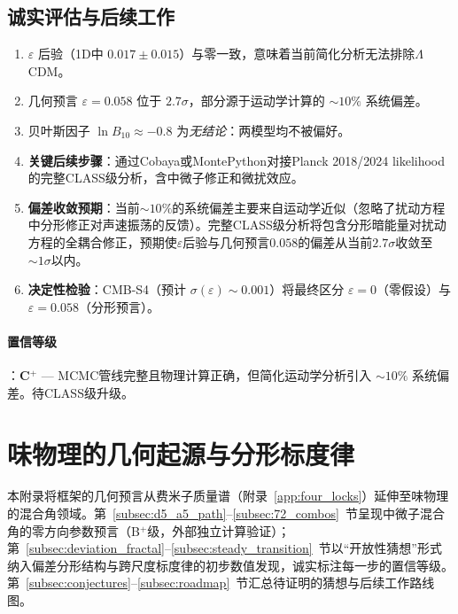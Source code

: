\documentclass[12pt,a4paper,twocolumn]{article}
\begin{document}
\subsection{诚实评估与后续工作}
\begin{enumerate}
\item $\varepsilon$ 后验（1D中 $0.017 \pm 0.015$）与零一致，意味着当前简化分析无法排除$\Lambda$CDM。
\item 几何预言 $\varepsilon = 0.058$ 位于 $2.7\sigma$，部分源于运动学计算的 $\sim 10\%$ 系统偏差。
\item 贝叶斯因子 $\ln B_{10} \approx -0.8$ 为\emph{无结论}：两模型均不被偏好。
\item \textbf{关键后续步骤}：通过Cobaya或MontePython对接Planck 2018/2024 likelihood的完整CLASS级分析，含中微子修正和微扰效应。
\item \textbf{偏差收敛预期}：当前$\sim10\%$的系统偏差主要来自运动学近似（忽略了扰动方程中分形修正对声速振荡的反馈）。完整CLASS级分析将包含分形暗能量对扰动方程的全耦合修正，预期使$\varepsilon$后验与几何预言$0.058$的偏差从当前$2.7\sigma$收敛至$\sim1\sigma$以内。
\item \textbf{决定性检验}：CMB-S4（预计 $\sigma(\varepsilon) \sim 0.001$）将最终区分 $\varepsilon = 0$（零假设）与 $\varepsilon = 0.058$（分形预言）。
\end{enumerate}

\paragraph{置信等级}：\textbf{C$^+$} --- MCMC管线完整且物理计算正确，但简化运动学分析引入 $\sim 10\%$ 系统偏差。待CLASS级升级。



\section{味物理的几何起源与分形标度律}
\label{app:flavor_geometry}

本附录将框架的几何预言从费米子质量谱（附录~\ref{app:four_locks}）延伸至味物理的混合角领域。第~\ref{subsec:d5_a5_path}--\ref{subsec:72_combos}~节呈现中微子混合角的零方向参数预言（B$^+$级，外部独立计算验证）；第~\ref{subsec:deviation_fractal}--\ref{subsec:steady_transition}~节以``开放性猜想''形式纳入偏差分形结构与跨尺度标度律的初步数值发现，诚实标注每一步的置信等级。第~\ref{subsec:conjectures}--\ref{subsec:roadmap}~节汇总待证明的猜想与后续工作路线图。
\end{document}
